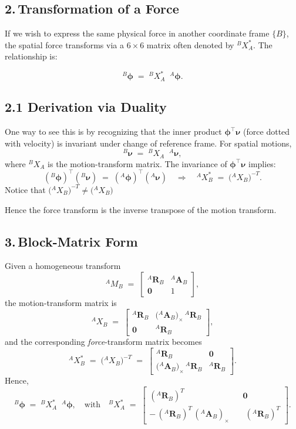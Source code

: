 \documentclass[10pt]{article}
\begin{document}
\subsection*{2.\,Transformation of a Force}

If we wish to express the same physical force in another coordinate frame \(\{B\}\), the spatial force transforms via a \(6\times6\) matrix often denoted by \({}^B\!X^{*}_A\).  The relationship is:

\[
{}^{B}\!\boldsymbol{\phi}
\;=\;
{}^{B}\!X^{*}_A\;\;{}^{A}\!\boldsymbol{\phi}.
\]

\subsection*{2.1 Derivation via Duality}

One way to see this is by recognizing that the inner product \(\boldsymbol{\phi}^\top \boldsymbol{\nu}\) (force dotted with velocity) is invariant under change of reference frame.  For spatial motions,
\[
{}^{B}\boldsymbol{\nu}
\;=\;
{}^{B}X_A \;\;{}^{A}\!\boldsymbol{\nu},
\]
where \({}^{B}X_A\) is the motion-transform matrix.  The invariance of \(\boldsymbol{\phi}^\top \boldsymbol{\nu}\) implies:
\[
({}^{B}\!\boldsymbol{\phi})^\top ({}^{B}\boldsymbol{\nu})
\;=\;
({}^{A}\!\boldsymbol{\phi})^\top ({}^{A}\boldsymbol{\nu})
\quad\Longrightarrow\quad
{}^{A}\!X^{*}_B
\;=\;
\bigl({}^{A}X_B\bigr)^{-T}.
\]
Notice that $\bigl({}^{A}X_B\bigr)^{-T} \neq \bigl({}^{A}X_B\bigr)$

Hence the force transform is the inverse transpose of the motion transform.

\subsection*{3.\,Block-Matrix Form}

Given a homogeneous transform
\[
{}^{A}\!M_{B}
\;=\;
\begin{bmatrix}
{}^{A}\mathbf{R}_{B} & {}^{A}\mathbf{A}_{B}\\[3pt]
\mathbf{0} & 1
\end{bmatrix},
\]
the motion-transform matrix is
\[
{}^{A}X_{B}
\;=\;
\begin{bmatrix}
{}^{A}\mathbf{R}_{B} & \bigl({}^{A}\mathbf{A}_{B}\bigr)_\times\,{}^{A}\mathbf{R}_{B}\\[3pt]
\mathbf{0} & {}^{A}\mathbf{R}_{B}
\end{bmatrix},
\]
and the corresponding \emph{force}-transform matrix becomes
\[
{}^{A}X^{*}_{B}
\;=\;
\bigl({}^{A}X_{B}\bigr)^{-T}
\;=\;
\begin{bmatrix}
{}^{A}\mathbf{R}_{B} & \mathbf{0}\\[3pt]
\bigl({}^{A}\mathbf{A}_{B}\bigr)_\times\,{}^{A}\mathbf{R}_{B} & {}^{A}\mathbf{R}_{B}
\end{bmatrix}.
\]
Hence,
\[
{}^{B}\!\boldsymbol{\phi}
\;=\;
{}^{B}X^{*}_{A}\;\;{}^{A}\!\boldsymbol{\phi}
,\quad
\text{with}
\quad
{}^{B}X^{*}_{A}
\;=\;
\begin{bmatrix}
({}^{A}\mathbf{R}_{B})^T & \mathbf{0}\\[4pt]
-\,({}^{A}\mathbf{R}_{B})^T\,({}^{A}\mathbf{A}_{B})_\times \;\;\; & \;({}^{A}\mathbf{R}_{B})^T
\end{bmatrix}.
\]
\end{document}
